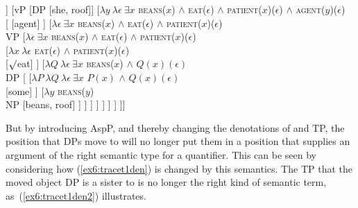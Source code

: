 \medskip
\begin{fullwidth}
\begin{exe}
\raggedright
	\ex \label{ex6:oldqcompvp}
	\small
	\begin{forest}
	[AspP [\ibar{Asp}
		[\obar{Asp} [asp]]
		[vP
			[DP [she, roof]]
			[$\lambda y\ \lambda \epsilon\ \exists x$ \textsc{beans}($x$) $\wedge$ \textsc{eat}($\epsilon$) $\wedge$ \textsc{patient}($x$)($\epsilon$) $\wedge$ \textsc{agent}($y$)($\epsilon$)\\  
				[ [agent] ]
				[$\lambda \epsilon\ \exists x$ \textsc{beans}($x$) $\wedge$ \textsc{eat}($\epsilon$) $\wedge$ \textsc{patient}($x$)($\epsilon$)\\VP [$\lambda \epsilon\ \exists x$ \textsc{beans}($x$) $\wedge$ \textsc{eat}($\epsilon$) $\wedge$ \textsc{patient}($x$)($\epsilon$)\\ 
					[$\lambda x\ \lambda \epsilon$ \textsc{eat}($\epsilon$) $\wedge$ \textsc{patient}($x$)($\epsilon$)\\ [$\surd$eat] ]
					[$\lambda Q\ \lambda \epsilon\ \exists x$ \textsc{beans}($x$) $\wedge$ $Q(x)(\epsilon)$\\DP [
						[$\lambda P\ \lambda Q\ \lambda \epsilon\ \exists x$ $P(x)$ $\wedge$ $Q(x)(\epsilon)$\\  [some] ]
						[$\lambda y$ \textsc{beans}($y$)\\NP [beans, roof] ]
					] ]
				] ]
			]
		 ]
	]]
	\end{forest}
\end{exe}
\end{fullwidth}
\medskip
But by introducing AspP, and thereby changing the denotations of  and TP, the position that DPs move to will no longer put them in a position that supplies an argument of the right semantic type for a quantifier. This can be seen by considering how (\ref{ex6:tracet1den}) is changed by this semantics. The TP that the moved object DP is a sister to is no longer the right kind of semantic term, as~(\ref{ex6:tracet1den2}) illustrates.
\medskip

